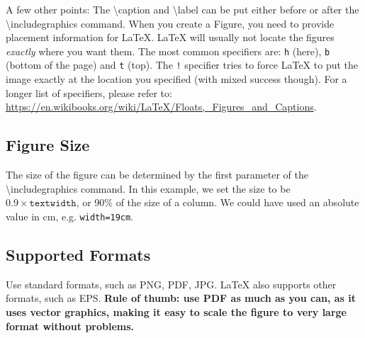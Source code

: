 A few other points: The \textbackslash{}caption and \textbackslash{}label can be put either before or after the \textbackslash{}includegraphics command.
When you create a Figure, you need to provide placement information for LaTeX. LaTeX will usually not locate the figures \emph{exactly} where you want them.
The most common specifiers are: \texttt{h} (here), \texttt{b} (bottom of the page) and \texttt{t} (top). The \texttt{!} specifier tries to force LaTeX to put the image exactly at the location you specified (with mixed success though).
For a longer list of specifiers, please refer to: \url{https://en.wikibooks.org/wiki/LaTeX/Floats,_Figures_and_Captions}.

\subsection{Figure Size}
The size of the figure can be determined by the first parameter of the \textbackslash{}includegraphics command.
In this example, we set the size to be $0.9 \times \texttt{textwidth}$, or 90\% of the size of a column.
We could have used an absolute value in cm, e.g. \texttt{width=19cm}.

\subsection{Supported Formats}
Use standard formats, such as PNG, PDF, JPG.
LaTeX also supports other formats, such as EPS.
\textbf{Rule of thumb: use PDF as much as you can, as it uses vector graphics, making it easy to scale the figure to very large format without problems.}

